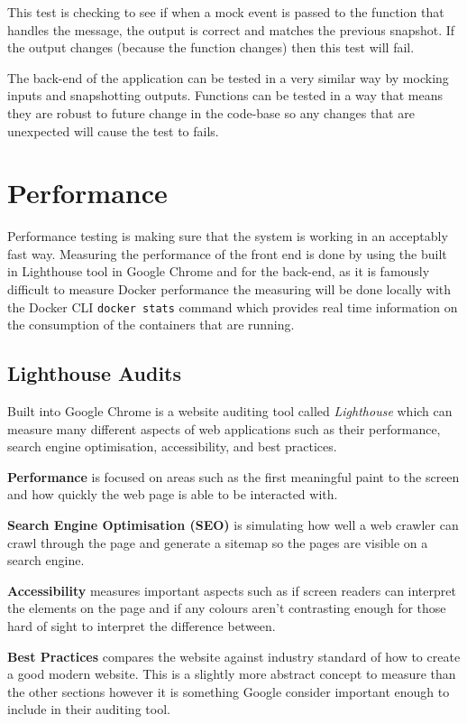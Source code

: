 This test is checking to see if when a mock event is passed to the function that handles the message, the output is correct and matches the previous snapshot. If the output changes (because the function changes) then this test will fail.

The back-end of the application can be tested in a very similar way by mocking inputs and snapshotting outputs. Functions can be tested in a way that means they are robust to future change in the code-base so any changes that are unexpected will cause the test to fails.

\section{Performance} \label{test:perf}

Performance testing is making sure that the system is working in an acceptably fast way. Measuring the performance of the front end is done by using the built in Lighthouse tool in Google Chrome and for the back-end, as it is famously difficult to measure Docker performance \cite{docker-perf} the measuring will be done locally with the Docker CLI \texttt{docker stats} command which provides real time information on the consumption of the containers that are running.

\subsection{Lighthouse Audits} \label{test:perf-light}

Built into Google Chrome is a website auditing tool called \textit{Lighthouse} \cite{google-lighthouse} which can measure many different aspects of web applications such as their performance, search engine optimisation, accessibility, and best practices. 

\textbf{Performance} is focused on areas such as the first meaningful paint to the screen and how quickly the web page is able to be interacted with. 

\textbf{Search Engine Optimisation (SEO)} is simulating how well a web crawler can crawl through the page and generate a sitemap so the pages are visible on a search engine. 

\textbf{Accessibility} measures important aspects such as if screen readers can interpret the elements on the page and if any colours aren't contrasting enough for those hard of sight to interpret the difference between.

\textbf{Best Practices} compares the website against industry standard of how to create a good modern website. This is a slightly more abstract concept to measure than the other sections however it is something Google consider important enough to include in their auditing tool. 

